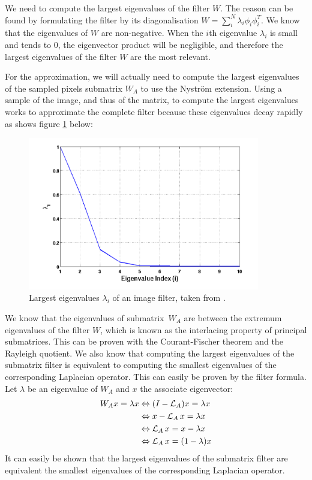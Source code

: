 We need to compute the largest eigenvalues of the filter \(W\).
\ifthesis
 The reason can be found by formulating the filter by its diagonalisation \(W = \sum_i^N \lambda_i \phi_i \phi_i^T\).
 We know that the eigenvalues of \(W\) are non-negative.
 When the \(i\)th eigenvalue \(\lambda_i\) is small and tends to 0, the eigenvector product will be negligible, and therefore the largest eigenvalues of the filter \(W\) are the most relevant.

 For the approximation, we will actually need to compute the largest eigenvalues of the sampled pixels submatrix \(W_A\) to use the Nystr\"om extension.
 Using a sample of the image, and thus of the matrix, to compute the largest eigenvalues works to approximate the complete filter because these eigenvalues decay rapidly as shows figure \ref{fig:eigenvalues} below:
 \begin{figure}[H]
   \centering
   \includegraphics[width=0.9\textwidth]{img/decayingEigenvalues.png}
   \caption{Largest eigenvalues \(\lambda_i\) of an image filter, taken from \cite{siam_slides_2016}.}
   \label{fig:eigenvalues}
 \end{figure}
\fi

\ifthesis
 We know that the eigenvalues of submatrix\ \(W_A\) are between the extremum eigenvalues of the filter \(W\), which is known as the interlacing property of principal submatrices.
 This can be proven with the Courant-Fischer theorem and the Rayleigh quotient.
 We also know that computing the largest eigenvalues of the submatrix filter is equivalent to computing the smallest eigenvalues of the corresponding Laplacian operator.
 This can easily be proven by the filter formula.
 Let \(\lambda\) be an eigenvalue of \(W_A\) and \(x\) the associate eigenvector:
 \begin{equation}
  \begin{split}
      W_A x = \lambda x & \Leftrightarrow (I - \operatorname{\mathcal{L}}_A)x = \lambda x \\
                      & \Leftrightarrow x - \operatorname{\mathcal{L}}_A x = \lambda x \\
                      & \Leftrightarrow \operatorname{\mathcal{L}}_A x = x - \lambda x \\
                      & \Leftrightarrow \operatorname{\mathcal{L}}_A x = (1 - \lambda) x
  \end{split}
 \end{equation}
\else
 It can easily be shown that the largest eigenvalues of the submatrix filter are equivalent the smallest eigenvalues of the corresponding Laplacian operator.
\fi

